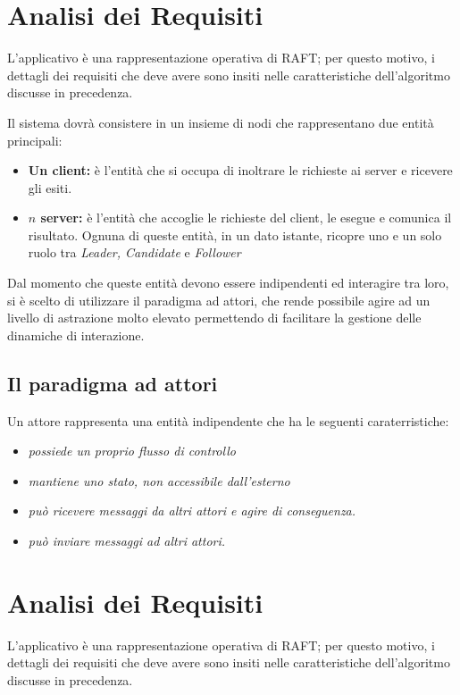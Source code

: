 \section{Analisi dei Requisiti} 
L'applicativo è una rappresentazione operativa di RAFT; per questo motivo, i dettagli dei requisiti che deve avere sono insiti nelle caratteristiche dell'algoritmo discusse in precedenza. 

Il sistema dovrà consistere in un insieme di nodi che rappresentano due entità principali:
	\begin{itemize}
		\item \textbf{Un client:} è l'entità che si occupa di inoltrare le richieste ai server e ricevere gli esiti.
		\item \textbf{$n$ server:} è l'entità che accoglie le richieste del client, le esegue e comunica il risultato. Ognuna di queste entità, in un dato istante, ricopre uno e un solo ruolo tra \textit{Leader, Candidate} e \textit{Follower}
	\end{itemize}

Dal momento che queste entità devono essere indipendenti ed interagire tra loro, si è scelto di utilizzare il paradigma ad attori, che rende possibile agire ad un livello di astrazione molto elevato permettendo di facilitare la gestione delle dinamiche di interazione.


	\subsection{Il paradigma ad attori}
	Un attore rappresenta una entità indipendente che ha le seguenti caraterristiche:
	\begin{itemize}
		\item \emph{possiede un proprio flusso di controllo}
		\item \emph{mantiene uno stato, non accessibile dall'esterno}
		\item \emph{può ricevere messaggi da altri attori e agire di conseguenza.}
		\item \emph{può inviare messaggi ad altri attori.}
	\end{itemize}
\section{Analisi dei Requisiti} \label{Actors}
L'applicativo è una rappresentazione operativa di RAFT; per questo motivo, i dettagli dei requisiti che deve avere sono insiti nelle caratteristiche dell'algoritmo discusse in precedenza. 

